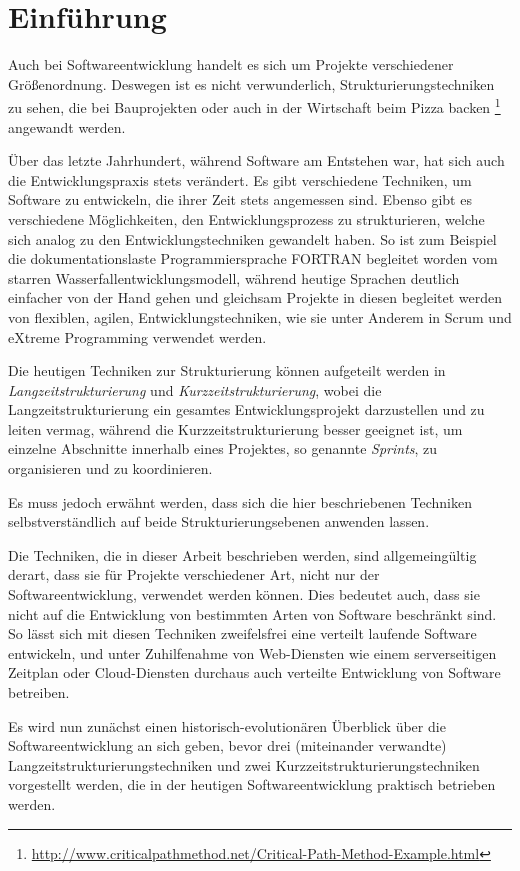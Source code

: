 	
\section{Einführung}
	\label{sec:introduction}
	Auch bei Softwareentwicklung handelt es sich um Projekte verschiedener Größenordnung.
	Deswegen ist es nicht verwunderlich, Strukturierungstechniken zu sehen, die bei Bauprojekten oder auch in der Wirtschaft beim Pizza backen \footnote{
		\url{http://www.criticalpathmethod.net/Critical-Path-Method-Example.html}
	} angewandt werden.
	
	Über das letzte Jahrhundert, während Software am Entstehen war, hat sich auch die Entwicklungspraxis stets verändert.
	Es gibt verschiedene Techniken, um Software zu entwickeln, die ihrer Zeit stets angemessen sind.
	Ebenso gibt es verschiedene Möglichkeiten, den Entwicklungsprozess zu strukturieren, welche sich analog zu den Entwicklungstechniken gewandelt haben.
	So ist zum Beispiel die dokumentationslaste Programmiersprache FORTRAN begleitet worden vom starren Wasserfallentwicklungsmodell, während heutige Sprachen deutlich einfacher von der Hand gehen und gleichsam Projekte in diesen begleitet werden von flexiblen, agilen, Entwicklungstechniken, wie sie unter Anderem in Scrum und eXtreme Programming verwendet werden.
	
	Die heutigen Techniken zur Strukturierung können aufgeteilt werden in \textit{Langzeitstrukturierung} und \textit{Kurzzeitstrukturierung}, wobei die Langzeitstrukturierung ein gesamtes Entwicklungsprojekt darzustellen und zu leiten vermag, während die Kurzzeitstrukturierung besser geeignet ist, um einzelne Abschnitte innerhalb eines Projektes, so genannte \textit{Sprints}, zu organisieren und zu koordinieren.
	
	Es muss jedoch erwähnt werden, dass sich die hier beschriebenen Techniken selbstverständlich auf beide Strukturierungsebenen anwenden lassen.
	
	Die Techniken, die in dieser Arbeit beschrieben werden, sind allgemeingültig derart, dass sie für Projekte verschiedener Art, nicht nur der Softwareentwicklung, verwendet werden können.
	Dies bedeutet auch, dass sie nicht auf die Entwicklung von bestimmten Arten von Software beschränkt sind.
	So lässt sich mit diesen Techniken zweifelsfrei eine verteilt laufende Software entwickeln, und unter Zuhilfenahme von Web-Diensten wie einem serverseitigen Zeitplan oder Cloud-Diensten durchaus auch verteilte Entwicklung von Software betreiben.
	
	Es wird nun zunächst einen historisch-evolutionären Überblick über die Softwareentwicklung an sich geben, bevor drei (miteinander verwandte) Langzeitstrukturierungstechniken und zwei Kurzzeitstrukturierungstechniken vorgestellt werden, die in der heutigen Softwareentwicklung praktisch betrieben werden.
	
